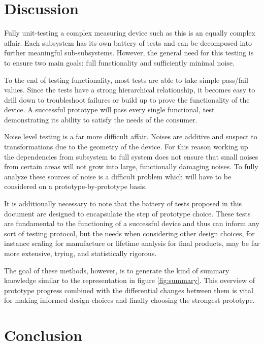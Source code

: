 \documentclass{article}
\begin{document}
\section{Discussion}
\label{sec:discussion}

Fully unit-testing a complex measuring device such as this is an equally complex affair. Each subsystem has its own battery of tests and can be decomposed into further meaningful sub-subsystems. However, the general need for this testing is to ensure two main goals: full functionality and sufficiently minimal noise.

To the end of testing functionality, most tests are able to take simple pass/fail values. Since the tests have a strong hierarchical relationship, it becomes easy to drill down to troubleshoot failures or build up to prove the functionality of the device. A successful prototype will pass every single functional, test demonstrating its ability to satisfy the needs of the consumer.

Noise level testing is a far more difficult affair. Noises are additive and suspect to transformations due to the geometry of the device. For this reason working up the dependencies from subsystem to full system does not ensure that small noises from certain areas will not grow into large, functionally damaging noises. To fully analyze these sources of noise is a difficult problem which will have to be considered on a prototype-by-prototype basis.

It is additionally necessary to note that the battery of tests proposed in this document are designed to encapsulate the step of prototype choice. These tests are fundamental to the functioning of a successful device and thus can inform any sort of testing protocol, but the needs when considering other design choices, for instance scaling for manufacture or lifetime analysis for final products, may be far more extensive, trying, and statistically rigorous.

The goal of these methods, however, is to generate the kind of summary knowledge similar to the representation in figure \ref{fig:summary}. This overview of prototype progress combined with the differential changes between them is vital for making informed design choices and finally choosing the strongest prototype.

\section{Conclusion}
\label{sec:conclusion}
\end{document}
